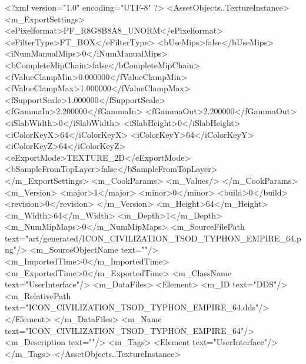 <?xml version="1.0" encoding="UTF-8" ?>
<AssetObjects..TextureInstance>
	<m_ExportSettings>
		<ePixelformat>PF_R8G8B8A8_UNORM</ePixelformat>
		<eFilterType>FT_BOX</eFilterType>
		<bUseMips>false</bUseMips>
		<iNumManualMips>0</iNumManualMips>
		<bCompleteMipChain>false</bCompleteMipChain>
		<fValueClampMin>0.000000</fValueClampMin>
		<fValueClampMax>1.000000</fValueClampMax>
		<fSupportScale>1.000000</fSupportScale>
		<fGammaIn>2.200000</fGammaIn>
		<fGammaOut>2.200000</fGammaOut>
		<iSlabWidth>0</iSlabWidth>
		<iSlabHeight>0</iSlabHeight>
		<iColorKeyX>64</iColorKeyX>
		<iColorKeyY>64</iColorKeyY>
		<iColorKeyZ>64</iColorKeyZ>
		<eExportMode>TEXTURE_2D</eExportMode>
		<bSampleFromTopLayer>false</bSampleFromTopLayer>
	</m_ExportSettings>
	<m_CookParams>
		<m_Values/>
	</m_CookParams>
	<m_Version>
		<major>1</major>
		<minor>0</minor>
		<build>0</build>
		<revision>0</revision>
	</m_Version>
	<m_Height>64</m_Height>
	<m_Width>64</m_Width>
	<m_Depth>1</m_Depth>
	<m_NumMipMaps>0</m_NumMipMaps>
	<m_SourceFilePath text="art/generated/ICON_CIVILIZATION_TSOD_TYPHON_EMPIRE_64.png"/>
	<m_SourceObjectName text=""/>
	<m_ImportedTime>0</m_ImportedTime>
	<m_ExportedTime>0</m_ExportedTime>
	<m_ClassName text="UserInterface"/>
	<m_DataFiles>
		<Element>
			<m_ID text="DDS"/>
			<m_RelativePath text="ICON_CIVILIZATION_TSOD_TYPHON_EMPIRE_64.dds"/>
		</Element>
	</m_DataFiles>
	<m_Name text="ICON_CIVILIZATION_TSOD_TYPHON_EMPIRE_64"/>
	<m_Description text=""/>
	<m_Tags>
		<Element text="UserInterface"/>
	</m_Tags>
</AssetObjects..TextureInstance>
